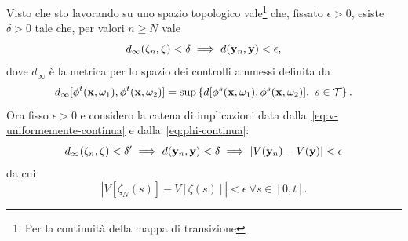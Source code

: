 \begin{steps}
    Visto che sto lavorando su uno spazio topologico vale\footnote{Per la continuità
    della mappa di transizione} che, fissato $\epsilon > 0$, esiste $\delta > 0$ tale che,
    per valori $n \geq N$ vale
    \begin{equation}
        d_\infty(\zeta_n, \zeta) < \delta \implies d(\mathbf{y}_n, \mathbf{y}) < \epsilon,
        \label{eq:phi-continua}
    \end{equation}
    dove $d_\infty$ è la metrica per lo spazio dei controlli ammessi definita da
    \begin{equation*}
        d_{\infty}[\phi^t(\b x, \omega_1), \phi^t(\b x, \omega_2)] =
        \sup \left\{ d[\phi^s(\b x, \omega_1), \phi^s(\b x, \omega_2)],\ s \in \mathcal T  \right\}.
    \end{equation*}
    Ora fisso $\epsilon > 0$ e considero la catena di implicazioni data
    dalla~\eqref{eq:v-uniformemente-continua} e dalla~\eqref{eq:phi-continua}:
    \begin{equation}
        d_\infty(\zeta_n, \zeta) < \delta' \implies d(\mathbf{y}_n, \mathbf{y}) < \delta \implies |V(\mathbf{y}_n) - V(\mathbf{y})| < \epsilon
        \label{eq:implication-chain}
    \end{equation}
    da cui
    \begin{equation}
        \left| V[\zeta_N(s)] - V[\zeta(s)] \right| < \epsilon\ \forall s \in [0, t].
        \label{eq:lesser-forall-t}
    \end{equation}


\end{steps}

